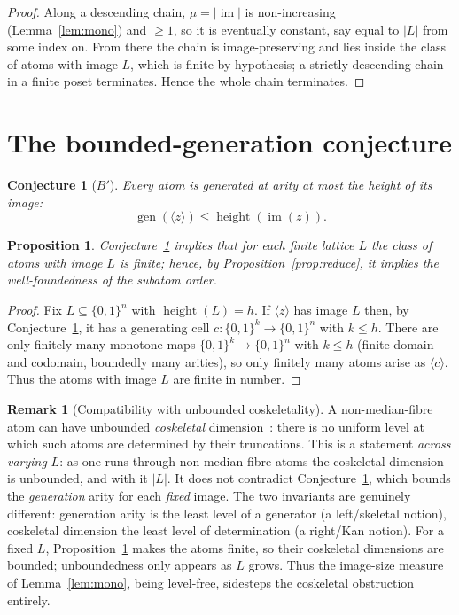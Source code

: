 \documentclass[11pt]{amsart}
\theoremstyle{plain}
\newtheorem{prop}[thm]{Proposition}
\newtheorem{conj}[thm]{Conjecture}
\theoremstyle{definition}
\newtheorem{rem}[thm]{Remark}
\newcommand{\B}{\{0,1\}}
\newcommand{\im}{\operatorname{im}}
\newcommand{\hgt}{\operatorname{height}}
\newcommand{\gen}{\operatorname{gen}}
\newcommand{\atom}[1]{\langle #1 \rangle}
\begin{document}
\begin{proof}
  Along a descending chain, $\mu=|\im|$ is non-increasing
  (Lemma~\ref{lem:mono}) and $\ge1$, so it is eventually constant, say
  equal to $|L|$ from some index on.  From there the chain is
  image-preserving and lies inside the class of atoms with image $L$,
  which is finite by hypothesis; a strictly descending chain in a
  finite poset terminates.  Hence the whole chain terminates.
\end{proof}

\section{The bounded-generation conjecture}

\begin{conj}[$B'$]\label{conj:Bprime}
  Every atom is generated at arity at most the height of its image:
  \[
    \gen(\atom{z}) \le \hgt(\im(z)).
  \]
\end{conj}

\begin{prop}\label{prop:Bfin}
  Conjecture~\ref{conj:Bprime} implies that for each finite lattice $L$
  the class of atoms with image $L$ is finite; hence, by
  Proposition~\ref{prop:reduce}, it implies the well-foundedness of the
  subatom order.
\end{prop}

\begin{proof}
  Fix $L\subseteq\B^{n}$ with $\hgt(L)=h$.  If $\atom{z}$ has image $L$
  then, by Conjecture~\ref{conj:Bprime}, it has a generating cell
  $c\colon\B^{k}\to\B^{n}$ with $k\le h$.  There are only finitely many
  monotone maps $\B^{k}\to\B^{n}$ with $k\le h$ (finite domain and
  codomain, boundedly many arities), so only finitely many atoms arise
  as $\atom{c}$.  Thus the atoms with image $L$ are finite in number.
\end{proof}

\begin{rem}[Compatibility with unbounded coskeletality]
  A non-median-fibre atom can have unbounded \emph{coskeletal}
  dimension~\cite{PaperW}: there is no uniform level at which such
  atoms are determined by their truncations.  This is a statement
  \emph{across varying} $L$: as one runs through non-median-fibre
  atoms the coskeletal dimension is unbounded, and with it $|L|$.  It
  does not contradict Conjecture~\ref{conj:Bprime}, which bounds the
  \emph{generation} arity for each \emph{fixed} image.  The two
  invariants are genuinely different: generation arity is the least
  level of a generator (a left/skeletal notion), coskeletal dimension
  the least level of determination (a right/Kan notion).  For a fixed
  $L$, Proposition~\ref{prop:Bfin} makes the atoms finite, so their
  coskeletal dimensions are bounded; unboundedness only appears as $L$
  grows.  Thus the image-size measure of Lemma~\ref{lem:mono}, being
  level-free, sidesteps the coskeletal obstruction entirely.
\end{rem}
\end{document}
